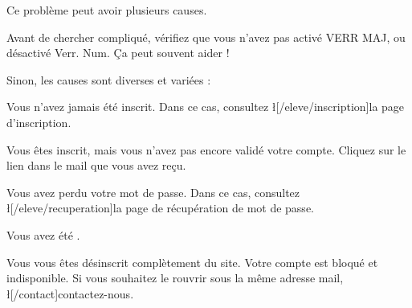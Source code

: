 Ce problème peut avoir plusieurs causes.

Avant de chercher compliqué, vérifiez que vous n'avez pas activé VERR MAJ, ou désactivé Verr. Num. Ça peut souvent aider !

Sinon, les causes sont diverses et variées :
\item Vous n'avez jamais été inscrit. Dans ce cas, consultez \l[/eleve/inscription]{la page d'inscription}.
\item Vous êtes inscrit, mais vous n'avez pas encore validé votre compte. Cliquez sur le lien dans le mail que vous avez reçu.
\item Vous avez perdu votre mot de passe. Dans ce cas, consultez \l[/eleve/recuperation]{la page de récupération de mot de passe}.
\item Vous avez été .
\item Vous vous êtes désinscrit complètement du site. Votre compte est bloqué et indisponible. Si vous souhaitez le rouvrir sous la même adresse mail, \l[/contact]{contactez-nous}.
